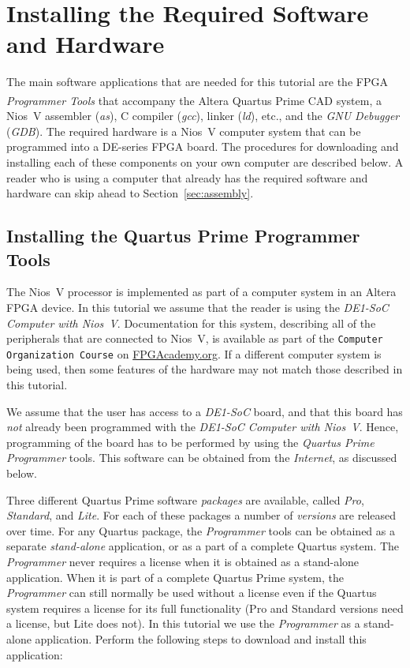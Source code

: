 \documentclass[11pt, twoside, pdftex]{article}
\begin{document}
\section{Installing the Required Software and Hardware}
\label{sec:getthem}

The main software applications that are needed for this tutorial are the FPGA {\it Programmer
Tools} that accompany the Altera Quartus\textsuperscript{\textregistered} Prime CAD system,
a Nios~V assembler ({\it as}), C compiler ({\it gcc}), linker ({\it ld}),
etc., and the {\it GNU Debugger} ({\it GDB}).  The required hardware is a Nios~V computer
system that can be programmed into a DE-series FPGA board. The procedures for downloading and 
installing each of these components on your own computer are described below. A reader who 
is using a computer that already has the required software and hardware can skip ahead to 
Section~\ref{sec:assembly}. 

\subsection{Installing the Quartus Prime Programmer Tools}
\label{sec:programmer}

The Nios~V processor is implemented as part of a computer system in an Altera FPGA device. 
In this tutorial we assume that the reader is using the {\it DE1-SoC Computer with Nios~V}.
Documentation for this system, describing all of the peripherals that are
connected to Nios~V, is available as part of the \texttt{Computer Organization Course} 
on {\small \href{https://www.fpgacademy.org/courses.html} {FPGAcademy.org}}. If a
different computer system is being used, then some features of the hardware may not match
those described in this tutorial.

We assume that the user has access to a {\it DE1-SoC} board, and that this board has {\it not} 
already been programmed with the {\it DE1-SoC Computer with Nios~V}. Hence, programming of 
the board has to be performed by using the {\it Quartus Prime Programmer} tools. This 
software can be obtained from the {\it Internet}, as discussed below. 

Three different Quartus Prime software {\it packages} are available, called {\it Pro},
{\it Standard}, and {\it Lite}. For each of these packages a number of {\it versions} are
released over time.  For any Quartus package, the {\it Programmer} tools can be 
obtained as a separate {\it stand-alone} application, or as a part of a complete 
Quartus system. The {\it Programmer} never requires a license when it is obtained as a
stand-alone application. When it is part of a complete Quartus Prime system, the
{\it Programmer} can still normally be used without a license even if the Quartus system 
requires a license for its full functionality (Pro and Standard versions need a license, but 
Lite does not). In this tutorial we use the {\it Programmer} as a stand-alone application. 
Perform the following steps to download and install this application:
\end{document}
